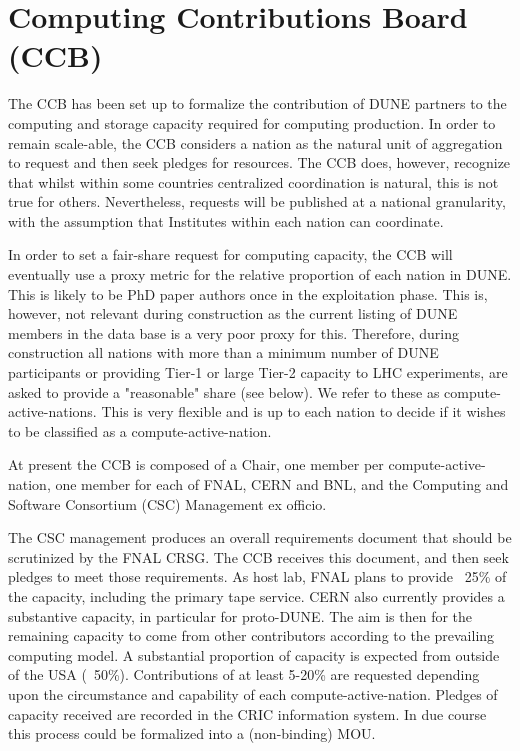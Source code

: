 \documentclass[../main-00.tex]{subfiles}
\begin{document}
\chapter{Computing Contributions Board (CCB) }
\label{ch:ccb}


The CCB has been set up to formalize the contribution of DUNE partners to the computing and storage capacity required for computing production. In order to remain scale-able, the CCB considers a nation as the natural unit of aggregation to request and then seek pledges for resources. The CCB does, however, recognize that whilst within some countries centralized coordination is natural, this is not true for others. Nevertheless, requests will be published at a national granularity, with the assumption that Institutes within each nation can coordinate.

In order to set a fair-share request for computing capacity, the CCB will eventually use a proxy metric for the relative proportion of each nation in DUNE. This is likely to be PhD paper authors once in the exploitation phase. This is, however, not relevant during construction as the current listing of DUNE members in the data base is a very poor proxy for this. Therefore, during construction all nations with more than a minimum number of DUNE participants or providing Tier-1 or large Tier-2 capacity to LHC experiments, are asked to provide a "reasonable" share (see below). We refer to these as compute-active-nations.
This is very flexible and is up to each nation to decide if it wishes to be classified as a compute-active-nation.

At present the CCB is composed of a Chair, one member per compute-active-nation, one member for each of FNAL, CERN and BNL, and the Computing and Software Consortium (CSC) Management ex officio.

The CSC management produces an overall requirements document that should be scrutinized by the FNAL CRSG. The CCB receives this document, and then seek pledges to meet those requirements. As host lab, FNAL plans to provide ~25\% of the capacity, including the primary tape service.
CERN also currently provides a substantive capacity, in particular for proto-DUNE.
The aim is then for the remaining capacity to come from other contributors according to the prevailing computing model. A substantial proportion of capacity is expected from outside of the USA  (~50\%). Contributions of at least 5-20\% are requested depending upon the circumstance and capability of each compute-active-nation.
Pledges of capacity received are recorded in the CRIC information system. In due course this process could be formalized into a (non-binding) MOU.
\end{document}
